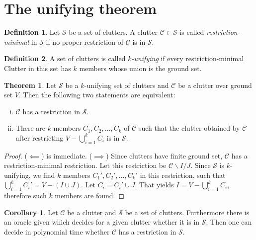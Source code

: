 \documentclass[a4paper, 12pt, twoside=false]{scrbook}
\theoremstyle{definition}
\newtheorem*{definition}{Definition}
\newtheorem{theorem}{Theorem}[chapter]
\newtheorem{corollary}{Corollary}
\begin{document}
\section{The unifying theorem}
   \begin{definition}
       Let $\mathcal{S}$ be a set of clutters.
       A clutter $\mathcal{C} \in \mathcal{S}$ is called \emph{restriction-minimal} in $\mathcal{S}$ if no proper restriction of $\mathcal{C}$ is in $\mathcal{S}$.
   \end{definition}

   \begin{definition}
       A set of clutters is called \emph{$k$-unifying} if every restriction-minimal Clutter in this set has $k$ members whose union is the ground set.
   \end{definition}

   \begin{theorem}
       Let $\mathcal{S}$ be a $k$-unifying set of clutters and $\mathcal{C}$ be a clutter over ground set $V$.
       Then the following two statements are equivalent:
       \leavevmode
       \begin{enumerate}[i)]
           \item $\mathcal{C}$ has a restriction in $\mathcal{S}$.
           \item There are $k$ members $C_1, C_2, \ldots, C_k$ of $\mathcal{C}$ such that the clutter obtained by $\mathcal{C}$ after restricting $V - \bigcup_{i=1}^k C_i$ is in $\mathcal{S}$.
       \end{enumerate}
   \end{theorem}

   \begin{proof}
       ($\impliedby$) is immediate.
       ($\implies$) Since clutters have finite ground set, $\mathcal{C}$ has a restriction-minimal restriction.
       Let this restriction be $\mathcal{C}\backslash I / J$.
       Since $\mathcal{S}$ is $k$-unifying, we find $k$ members $C_1', C_2', \ldots, C_k'$ in this restriction, such that $\bigcup_{i=1}^k C_i' = V - (I \cup J)$.
 Let $C_i = C_i' \cup J$.
       That yields $I=V-\bigcup_{i=1}^k C_i$, therefore such $k$ members are found.
   \end{proof}
   \begin{corollary}
       Let $\mathcal{C}$ be a clutter and $\mathcal{S}$ be a set of clutters.
       Furthermore there is an oracle given which decides for a given clutter whether it is in $\mathcal{S}$.
       Then one can decide in polynomial time whether $\mathcal{C}$ has a restriction in $\mathcal{S}$.
   \end{corollary}
\end{document}
